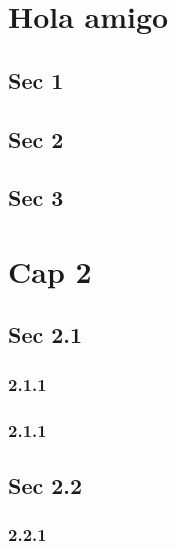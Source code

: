 \documentclass{article}
\begin{document}
\chapter{Hola amigo}

\section{Sec 1}


\section{Sec 2}


\section{Sec 3}

\chapter{Cap 2}


\section{Sec 2.1}

\subsection{2.1.1}


\subsection{2.1.1}

\section{Sec 2.2}

\subsection{2.2.1}



\end{document}
